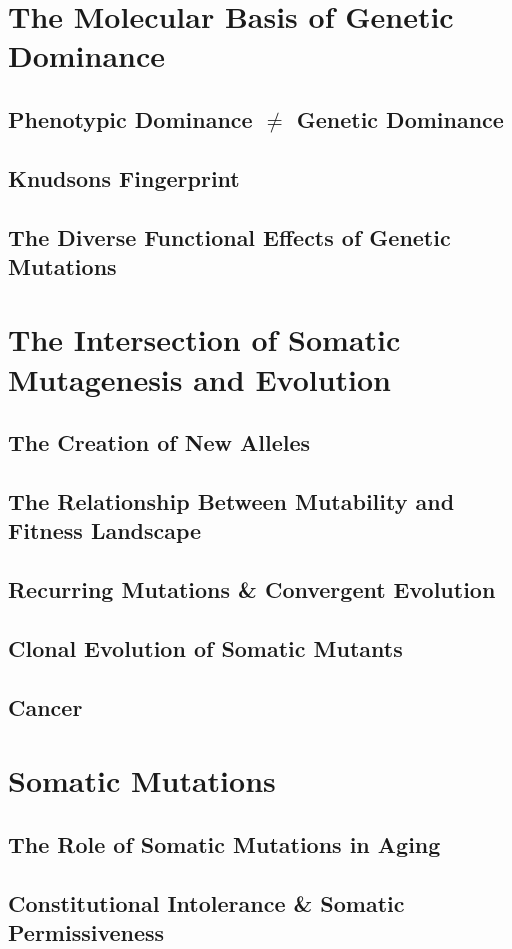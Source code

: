 \section{The Molecular Basis of Genetic Dominance}
\subsection{Phenotypic Dominance $\neq$ Genetic Dominance}
\subsection{Knudsons Fingerprint}
\subsection{The Diverse Functional Effects of Genetic Mutations}

\section{The Intersection of Somatic Mutagenesis and Evolution}
\subsection{The Creation of New Alleles}
\subsection{The Relationship Between Mutability and Fitness Landscape}
\subsection{Recurring Mutations \& Convergent Evolution}
\subsection{Clonal Evolution of Somatic Mutants}
\subsection{Cancer}

\section{Somatic Mutations}
\subsection{The Role of Somatic Mutations in Aging}
\subsection{Constitutional Intolerance \& Somatic Permissiveness}
